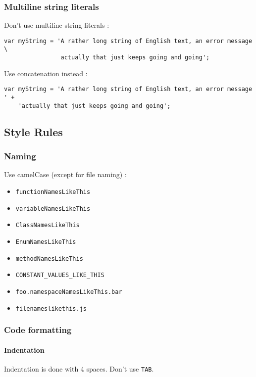 \subsubsection{Multiline string literals}

Don't use multiline string literals :
\begin{lstlisting}
var myString = 'A rather long string of English text, an error message \
                actually that just keeps going and going';
\end{lstlisting}

Use concatenation instead :
\begin{lstlisting}
var myString = 'A rather long string of English text, an error message ' +
    'actually that just keeps going and going';
\end{lstlisting}

\subsection{Style Rules}

\subsubsection{Naming}

Use camelCase (except for file naming) :
\begin{itemize}
	\item \lstinline{functionNamesLikeThis}
	\item \lstinline{variableNamesLikeThis}
	\item \lstinline{ClassNamesLikeThis}
	\item \lstinline{EnumNamesLikeThis}
	\item \lstinline{methodNamesLikeThis}
	\item \lstinline{CONSTANT_VALUES_LIKE_THIS}
	\item \lstinline{foo.namespaceNamesLikeThis.bar}
	\item \lstinline{filenameslikethis.js}
\end{itemize}

\subsubsection{Code formatting}

\paragraph{Indentation}
Indentation is done with 4 spaces. Don't use \lstinline{TAB}.

